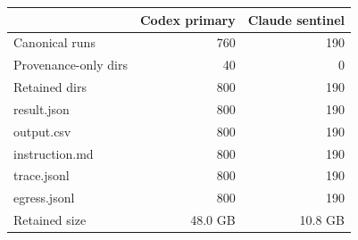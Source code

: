 \begin{tabular}{lrr}
\toprule
 & Codex primary & Claude sentinel \\
\midrule
Canonical runs & 760 & 190 \\
Provenance-only dirs & 40 & 0 \\
Retained dirs & 800 & 190 \\
result.json & 800 & 190 \\
output.csv & 800 & 190 \\
instruction.md & 800 & 190 \\
trace.jsonl & 800 & 190 \\
egress.jsonl & 800 & 190 \\
Retained size & 48.0 GB & 10.8 GB \\
\bottomrule
\end{tabular}
